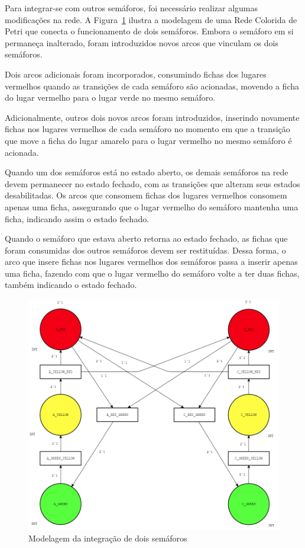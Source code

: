Para integrar-se com outros semáforos, foi necessário realizar algumas modificações na rede.
A Figura~\ref{fig:two_traffic_lights} ilustra a modelagem de uma Rede Colorida de Petri que conecta o funcionamento de dois semáforos.
Embora o semáforo em si permaneça inalterado, foram introduzidos novos arcos que vinculam os dois semáforos.

Dois arcos adicionais foram incorporados, consumindo fichas dos lugares vermelhos quando as transições de cada semáforo são acionadas, movendo a ficha do lugar vermelho para o lugar verde no mesmo semáforo.

Adicionalmente, outros dois novos arcos foram introduzidos, inserindo novamente fichas nos lugares vermelhos de cada semáforo no momento em que a transição que move a ficha do lugar amarelo para o lugar vermelho no mesmo semáforo é acionada.

Quando um dos semáforos está no estado aberto, os demais semáforos na rede devem permanecer no estado fechado, com as transições que alteram seus estados desabilitadas.
Os arcos que consomem fichas dos lugares vermelhos consomem apenas uma ficha, assegurando que o lugar vermelho do semáforo mantenha uma ficha, indicando assim o estado fechado.

Quando o semáforo que estava aberto retorna ao estado fechado, as fichas que foram consumidas dos outros semáforos devem ser restituídas.
Dessa forma, o arco que insere fichas nos lugares vermelhos dos semáforos passa a inserir apenas uma ficha, fazendo com que o lugar vermelho do semáforo volte a ter duas fichas, também indicando o estado fechado.

\begin{figure}[ht]
	\centering
	\includegraphics[width=1\textwidth]{images/two_traffic_lights.png}
	\caption{Modelagem da integração de dois semáforos}
    \label{fig:two_traffic_lights}
\end{figure}

